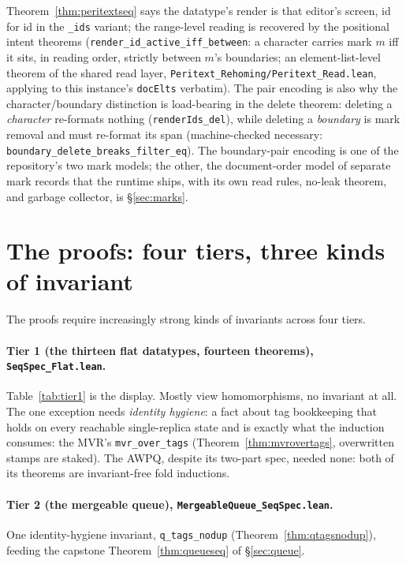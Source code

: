 \documentclass[11pt]{article}
\newcommand{\code}[1]{\texttt{#1}}
\begin{document}
\noindent Theorem~\ref{thm:peritextseq} says the datatype's render is
that editor's screen, id for id in the \code{\_ids} variant; the
range-level reading is recovered by the positional intent theorems
(\code{render\_id\_active\_iff\_between}: a character carries mark $m$
iff it sits, in reading order, strictly between $m$'s boundaries; an
element-list-level theorem of the shared read layer,
\code{Peritext\_Rehoming/Peritext\_Read.lean}, applying to this
instance's \code{docElts} verbatim).
The pair encoding is also why the character/boundary distinction is
load-bearing in the delete theorem: deleting a \emph{character}
re-formats nothing (\code{renderIds\_del}), while deleting a
\emph{boundary} is mark removal and must re-format its span
(machine-checked necessary: \code{boundary\_delete\_breaks\_filter\_eq}).
The boundary-pair encoding is one of the repository's two mark models;
the other, the document-order model of separate mark records that the
runtime ships, with its own read rules, no-leak theorem, and garbage
collector, is \S\ref{sec:marks}.

\section{The proofs: four tiers, three kinds of invariant}
\label{sec:tiers}

The proofs require increasingly strong kinds of invariants across four tiers.

\paragraph{Tier 1 (the thirteen flat datatypes, fourteen theorems),
\code{SeqSpec\_Flat.lean}.}
Table~\ref{tab:tier1} is the display. Mostly view homomorphisms, no
invariant at all. The one exception needs \emph{identity hygiene}:
a fact about tag bookkeeping that holds on every reachable
single-replica state and is exactly what the induction consumes: the
MVR's \code{mvr\_over\_tags} (Theorem~\ref{thm:mvrovertags},
overwritten stamps are staked). The AWPQ, despite its two-part spec,
needed none: both of its theorems are invariant-free fold
inductions.

\paragraph{Tier 2 (the mergeable queue),
\code{MergeableQueue\_SeqSpec.lean}.}
One identity-hygiene invariant, \code{q\_tags\_nodup}
(Theorem~\ref{thm:qtagsnodup}), feeding the capstone
Theorem~\ref{thm:queueseq} of \S\ref{sec:queue}.
\end{document}
